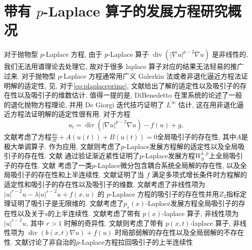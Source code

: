 \documentclass[oneside,longtitle]{LZUthesis}
\numberwithin{equation}{chapter}
\newcommand*\abs[1]{\lvert#1\rvert}
\DeclareMathOperator{\Div}{div}
\begin{document}
\section{带有 $p$-Laplace 算子的发展方程研究概况}
对于抛物型 $p$-Laplace 方程, 由于 $p$-Laplace 算子 $\Div(\abs{\nabla u}^{p-2}\nabla u)$ 是非线性的, 我们无法用谱理论去处理它, 故对于很多 laplace 算子对应的结果无法轻易的推广过来.
对于抛物型 $p$-Laplace 方程通常用广义 Galerkin 法或者非退化逼近方程法证明解的适定性, 见\citep{babinAttractorsEvolutionEquations1992a},
对于\cref{eq:plaplaceprime}, 文献\citep{efendievAttractorsDegenerateParabolic2013b}给出了解的适定性以及吸引子的存在性以及吸引子的维数估计.
值得一提的是, DiBenedetto 在\citep{dibenedettoDegenerateParabolicEquations1993a}里系统的论述了一般的退化抛物方程理论,
并用 De Giorgi 迭代技巧证明了 $L^\infty$ 估计, 这在用非退化逼近方程法证明解的适定性很有用.
对于方程
\begin{equation}\label{eq:plaplaceprime}
	u_t = \Div(\abs{\nabla u}^{p - 2}\nabla u) - f(u) + g,
\end{equation}
文献\citep{carvalhoGlobalAttractorsProblems1999}考虑了方程$\frac{du}{dt}+A(u(t))+B(u(t))=0$全局吸引子的存在性, 其中$A$是极大单调算子.
作为应用, 文献\citep{cholewaGlobalAttractorsAbstract2000a}则考虑了$p$-Laplace发展方程解的适定性以及全局吸引子的存在性.
文献\citep{yangGlobalAttractorsPLaplacian2007} 通过验证渐近紧性证明了$p$-Laplace发展方程$W_0^{1, p}$上全局吸引子的存在性.
文献\citep{simsenLaplacianDifferentialInclusions2009} 考虑了一类$p$-Laplace微分包含耦合系统全局解的存在性, 以及全局吸引子的存在性和上半连续性.
文献\citep{liuAsymptoticRegularityPLaplacian2010}证明了当 $f$ 满足多项式增长条件时方程解的适定性和吸引子的存在性以及吸引子的维数.
文献\citep{zhongZ2IndexGlobal2010}考虑了非线性项为 $\abs{u}^{r-2}u - \lambda\abs{u}^{s-2}u + f(x, u)$ 的 $p$-Laplace 方程的吸引子的存在性并用$Z_2$指标定理证明了吸引子是无限维的.
文献\citep{simsenLaplacianParabolicProblems2014a}考虑了$p_s(x)$-Laplace发展方程全局吸引子的存在性以及关于$s$的上半连续性.
文献\citep{guoSingularPhenomenaSolutions2015}考虑了带有 $p(x)$-laplace 算子, 非线性项为 $\abs{u}^{r-2}u$, 其中 $r > 1$ 时解的奇异性.
文献\citep{gaoExistenceUniquenessNonexistence2016}则考虑了带有 $p(x, t)$-laplace 算子, 非线性项为 $\Div(b(x, t)\nabla u) + f(u)$ 时局部弱解的存在性以及全局弱解的不存在性.
文献\citep{liuExistenceUpperSemicontinuity2017b}讨论了非自治的$p$-Laplace方程拉回吸引子的上半连续性
\end{document}
